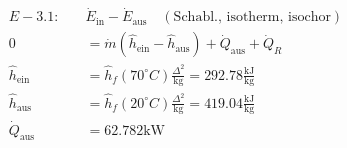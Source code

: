 

\item[a)] 
    \begin{align*}
        E - 3.1: \quad & \dot{E}_{\text{in}} - \dot{E}_{\text{aus}} \quad (\text{Schabl., isotherm, isochor}) \\
        0 &= \dot{m} (\hat{h}_{\text{ein}} - \hat{h}_{\text{aus}}) + \dot{Q}_{\text{aus}} + \dot{Q}_R \\
        \hat{h}_{\text{ein}} &= \hat{h}_f (70^\circ C) \frac{\Delta^2}{\text{kg}} = 292.78 \frac{\text{kJ}}{\text{kg}} \\
        \hat{h}_{\text{aus}} &= \hat{h}_f (20^\circ C) \frac{\Delta^2}{\text{kg}} = 419.04 \frac{\text{kJ}}{\text{kg}} \\
        \dot{Q}_{\text{aus}} &= 62.782 \text{kW}
    \end{align*}